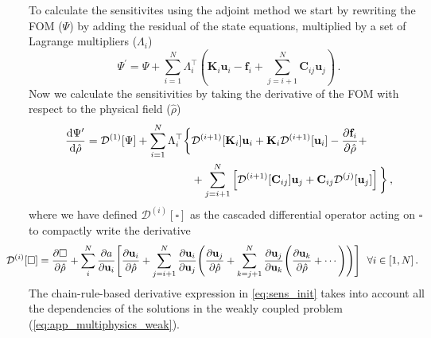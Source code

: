 To calculate the sensitivites using the adjoint method we start by rewriting the FOM ($\Psi$) by adding the residual
of the state equations, multiplied by a set of Lagrange multipliers ($\Lambda_i$)
\begin{equation}\label{eq:adj_init}
    \Psi^\prime =\Psi + \sum^N_{i=1} \Lambda_{i}^{\top}\left(\mathbf{K}_i \mathbf{u}_i -\mathbf{f}_i + \sum^N_{j=i+1} \mathbf{C}_{ij} \mathbf{u}_j \right)\,.
\end{equation}
Now we calculate the sensitivities by taking the derivative of the FOM with respect to the physical field ($\hat{\rho}$)
\begin{align}\label{eq:sens_init}
    \frac{\mathop{}\!\text{d} \Psi^\prime}{\mathop{}\!\text{d} \hat{\rho}} 
    =  
     \mathcal{D}^{(1)}[\Psi]
    + \sum_{i=1}^N  \Lambda_i^\top \bigg\{& 
        \mathcal{D}^{(i+1)}[\mathbf{K}_i] \mathbf{u}_i 
        + \mathbf{K}_i \mathcal{D}^{(i+1)}[\mathbf{u}_i] - \frac{\partial \mathbf{f}_i}{\partial \hat{\rho}} + \nonumber \\
        & 
        + \sum_{j=i+1}^{N}\left[ 
            \mathcal{D}^{(i+1)}[\mathbf{C}_{ij}]  \mathbf{u}_j 
            + \mathbf{C}_{ij} \mathcal{D}^{(j)}[\mathbf{u}_j] 
        \right]
    \bigg\}\,, 
\end{align}
where we have defined $\mathcal{D}^{(i)}[\square]$ as the cascaded differential operator acting on $\square$ to compactly write the derivative
\begin{align}
    \hspace*{-0.775cm}\mathcal{D}^{(i)}[\square] &= \frac{\partial \square }{\partial \hat{\rho}} + \sum^N_{i} \frac{\partial a}{\partial \mathbf{u}_i} \Bigg[ \frac{\partial \mathbf{u}_i}{\partial \hat{\rho}} + 
    \sum_{j=i+1}^{N} \frac{\partial \mathbf{u}_i}{\partial \mathbf{u}_j} \Bigg( \frac{\partial \mathbf{u}_j}{\partial \hat{\rho}} + 
    \sum_{k=j+1}^{N} \frac{\partial \mathbf{u}_j}{\partial \mathbf{u}_k} \Bigg( \frac{\partial \mathbf{u}_k}{\partial \hat{\rho}} + \cdots \Bigg) \Bigg) \Bigg] \,\,\,\, \forall i \in [1, N] \,.
\end{align}
The chain-rule-based derivative expression in \eqref{eq:sens_init} takes into account all the dependencies of the solutions in the weakly coupled problem (\eqref{eq:app_multiphysics_weak}).

